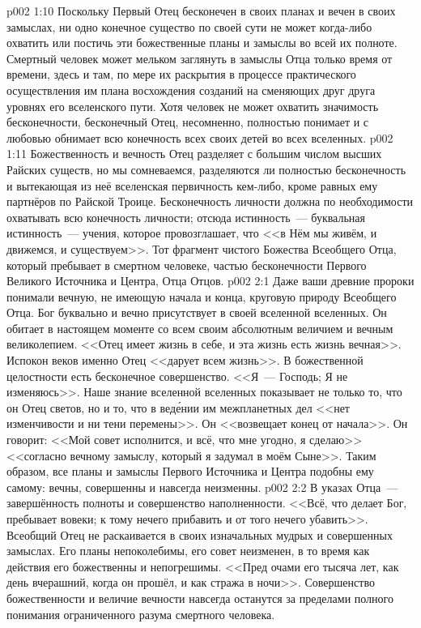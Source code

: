 \vs p002 1:10 \pc Поскольку Первый Отец бесконечен в своих планах и вечен в своих замыслах, ни одно конечное существо по своей сути не может когда\hyp{}либо охватить или постичь эти божественные планы и замыслы во всей их полноте. Смертный человек может мельком заглянуть в замыслы Отца только время от времени, здесь и там, по мере их раскрытия в процессе практического осуществления им плана восхождения созданий на сменяющих друг друга уровнях его вселенского пути. Хотя человек не может охватить значимость бесконечности, бесконечный Отец, несомненно, полностью понимает и с любовью обнимает всю конечность всех своих детей во всех вселенных.
\vs p002 1:11 Божественность и вечность Отец разделяет с большим числом высших Райских существ, но мы сомневаемся, разделяются ли полностью бесконечность и вытекающая из неё вселенская первичность кем\hyp{}либо, кроме равных ему партнёров по Райской Троице. Бесконечность личности должна по необходимости охватывать всю конечность личности; отсюда истинность~--- буквальная истинность~--- учения, которое провозглашает, что <<в Нём мы живём, и движемся, и существуем>>. Тот фрагмент чистого Божества Всеобщего Отца, который пребывает в смертном человеке,  частью бесконечности Первого Великого Источника и Центра, Отца Отцов.
\vs p002 2:1 Даже ваши древние пророки понимали вечную, не имеющую начала и конца, круговую природу Всеобщего Отца. Бог буквально и вечно присутствует в своей вселенной вселенных. Он обитает в настоящем моменте со всем своим абсолютным величием и вечным великолепием. <<Отец имеет жизнь в себе, и эта жизнь есть жизнь вечная>>. Испокон веков именно Отец <<дарует всем жизнь>>. В божественной целостности есть бесконечное совершенство. <<Я~--- Господь; Я не изменяюсь>>. Наше знание вселенной вселенных показывает не только то, что он Отец светов, но и то, что в вед\'ении им межпланетных дел <<нет изменчивости и ни тени перемены>>. Он <<возвещает конец от начала>>. Он говорит: <<Мой совет исполнится, и всё, что мне угодно, я сделаю>> <<согласно вечному замыслу, который я задумал в моём Сыне>>. Таким образом, все планы и замыслы Первого Источника и Центра подобны ему самому: вечны, совершенны и навсегда неизменны.
\vs p002 2:2 В указах Отца~--- завершённость полноты и совершенство наполненности. <<Всё, что делает Бог, пребывает вовеки; к тому нечего прибавить и от того нечего убавить>>. Всеобщий Отец не раскаивается в своих изначальных мудрых и совершенных замыслах. Его планы непоколебимы, его совет неизменен, в то время как действия его божественны и непогрешимы. <<Пред очами его тысяча лет, как день вчерашний, когда он прошёл, и как стража в ночи>>. Совершенство божественности и величие вечности навсегда останутся за пределами полного понимания ограниченного разума смертного человека.

